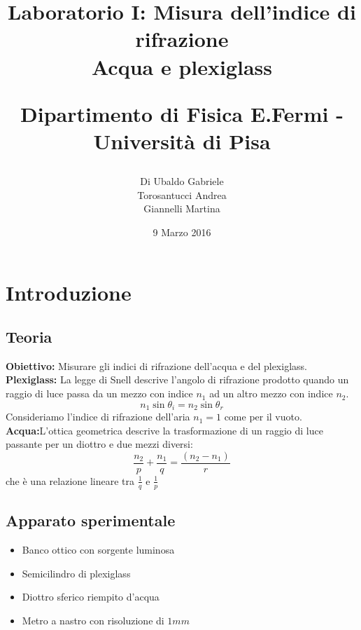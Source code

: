 \documentclass[a4paper,10pt]{article}
\title{Laboratorio I: Misura dell'indice di rifrazione\\Acqua e plexiglass\\
\begin{large}
Dipartimento di Fisica E.Fermi - Università di Pisa
\end{large}}
\author{Di Ubaldo Gabriele \\Torosantucci Andrea \\ Giannelli Martina}
\date{9 Marzo 2016}
\begin{document}
\maketitle

\tableofcontents

\section{Introduzione}
\subsection{Teoria}
\textbf{Obiettivo:} Misurare gli indici di rifrazione dell'acqua e del plexiglass.\\
\textbf{Plexiglass:} La legge di Snell descrive l'angolo di rifrazione prodotto quando un raggio di luce passa da un mezzo con indice $n_1$ ad un altro mezzo con indice $n_2$.
\begin{equation}
 n_1 \sin\theta_i=n_2\sin\theta_r
\end{equation}
Consideriamo l'indice di rifrazione dell'aria $n_1=1$ come per il vuoto.
\\ \textbf{Acqua:}L'ottica geometrica descrive la trasformazione di un raggio di luce passante per un diottro e due mezzi diversi:
\begin{equation}
 \frac{n_2}{p}+\frac{n_1}{q}=\frac{(n_2-n_1)}{r}
\end{equation}
che è una relazione lineare tra $\frac{1}{q}$ e $\frac{1}{p}$

\subsection{Apparato sperimentale}
\begin{itemize}
\item{Banco ottico con sorgente luminosa}
\item{Semicilindro di plexiglass}
\item{Diottro sferico riempito d'acqua}
\item{Metro a nastro con risoluzione di $1mm$}
\end{itemize}

\end{document}
